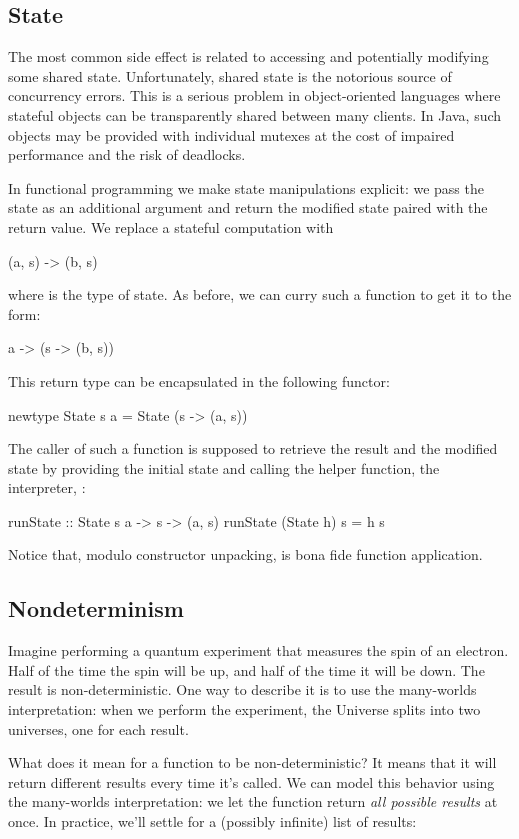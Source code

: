 \documentclass[DaoFP]{subfiles}
\begin{document}
\subsection{State}

The most common side effect is related to accessing and potentially modifying some shared state. Unfortunately, shared state is the notorious source of concurrency errors. This is a serious problem in object-oriented languages where stateful objects can be transparently shared between many clients. In Java, such objects may be provided with individual mutexes at the cost of impaired performance and the risk of deadlocks.

In functional programming we make state manipulations explicit: we pass the state as an additional argument and return the modified state paired with the return value. We replace a stateful computation  with
\begin{haskell}
(a, s) -> (b, s)
\end{haskell}
where  is the type of state. As before, we can curry such a function to get it to the form:
\begin{haskell}
a -> (s -> (b, s))
\end{haskell}
This return type can be encapsulated in the following functor:
\begin{haskell}
newtype State s a = State (s -> (a, s))
\end{haskell}
The caller of such a function is supposed to retrieve the result and the modified state by providing the initial state and calling the helper function, the interpreter, :
\begin{haskell}
runState :: State s a -> s -> (a, s)
runState (State h) s = h s
\end{haskell}
Notice that, modulo constructor unpacking,  is bona fide function application. 

\subsection{Nondeterminism}

Imagine performing a quantum experiment that measures the spin of an electron. Half of the time the spin will be up, and half of the time it will be down. The result is non-deterministic. One way to describe it is to use the many-worlds interpretation: when we perform the experiment, the Universe splits into two universes, one for each result.  

What does it mean for a function to be non-deterministic? It means that it will return different results every time it's called. We can model this behavior using the many-worlds interpretation: we let the function return \emph{all possible results} at once. In practice, we'll settle for a (possibly infinite) list of results:
\end{document}
